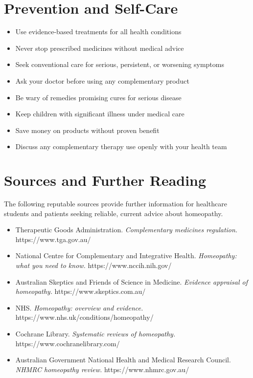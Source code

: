 \section*{Prevention and Self-Care}
\begin{itemize}
    \item Use evidence-based treatments for all health conditions
    \item Never stop prescribed medicines without medical advice
    \item Seek conventional care for serious, persistent, or worsening symptoms
    \item Ask your doctor before using any complementary product
    \item Be wary of remedies promising cures for serious disease
    \item Keep children with significant illness under medical care
    \item Save money on products without proven benefit
    \item Discuss any complementary therapy use openly with your health team
\end{itemize}

\section*{Sources and Further Reading}
The following reputable sources provide further information for healthcare students and patients seeking reliable, current advice about homeopathy.

\begin{itemize}
    \item Therapeutic Goods Administration. \textit{Complementary medicines regulation.} https://www.tga.gov.au/
    \item National Centre for Complementary and Integrative Health. \textit{Homeopathy: what you need to know.} https://www.nccih.nih.gov/
    \item Australian Skeptics and Friends of Science in Medicine. \textit{Evidence appraisal of homeopathy.} https://www.skeptics.com.au/
    \item NHS. \textit{Homeopathy: overview and evidence.} https://www.nhs.uk/conditions/homeopathy/
    \item Cochrane Library. \textit{Systematic reviews of homeopathy.} https://www.cochranelibrary.com/
    \item Australian Government National Health and Medical Research Council. \textit{NHMRC homeopathy review.} https://www.nhmrc.gov.au/
\end{itemize}
